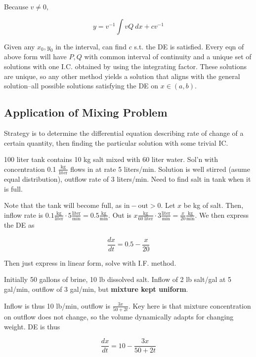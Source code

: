 Because $v\neq 0$,

\begin{equation}
    y=v^{-1}\int vQ\: dx + cv^{-1}
\end{equation}

Given any $x_0,y_0$ in the interval, can find $c$ s.t. the DE is satisfied.
Every eqn of above form will have $P,Q$ with common interval of continuity and a unique set of solutions with one I.C. obtained by using the integrating factor.
These solutions are unique, so any other method yields a solution that aligns with the general solution–all possible solutions satisfying the DE on $x\in (a,b)$.

\subsection{Application of Mixing Problem}

Strategy is to determine the differential equation describing rate of change of a certain quantity, then finding the particular solution with some trivial IC.

\begin{example}
    100 liter tank contains 10 kg salt mixed with 60 liter water. Sol'n with concentration 0.1 $\frac{\mathrm{kg}}{\mathrm{liter}}$ flows in at rate 5 liters/min.
    Solution is well stirred (asume equal distribution), outflow rate of 3 liters/min. Need to find salt in tank when it is full.

    Note that the tank will become full, as $\mathrm{in}-\mathrm{out}>0$. Let $x$ be kg of salt.
    Then, inflow rate is $0.1 \frac{\mathrm{kg}}{\mathrm{liter}}\cdot 5\frac{\mathrm{liter}}{\mathrm{min}}=0.5\frac{\mathrm{kg}}{\mathrm{min}}$. Out is
    $x \frac{\mathrm{kg}}{60\;\mathrm{liter}}\cdot 3\frac{\mathrm{liter}}{\mathrm{min}}=\frac{x}{20}\frac{\mathrm{kg}}{\mathrm{min}}$. We then express the DE as

    \begin{equation}
        \frac{dx}{dt}=0.5-\frac{x}{20}
    \end{equation}

    Then just express in linear form, solve with I.F. method.
\end{example}

\begin{example}
    Initially 50 gallons of brine, 10 lb dissolved salt. Inflow of 2 lb salt/gal at 5 gal/min, outflow of 3 gal/min, but \textbf{mixture kept uniform}.

    Inflow is thus 10 lb/min, outflow is $\frac{3x}{50+2t}$. Key here is that mixture concentration on outflow does not change, so the volume dynamically adapts for changing weight.
    DE is thus

    \begin{equation}
        \frac{dx}{dt}=10-\frac{3x}{50+2t}
    \end{equation}
\end{example}


